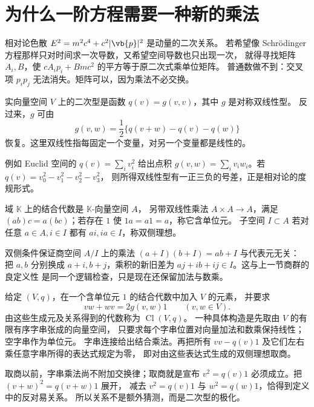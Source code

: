 \section{为什么一阶方程需要一种新的乘法}
\label{sec:math-clifford-first}

相对论色散 \(E^2=m^2c^4+c^2|\vb{p}|^2\) 是动量的二次关系。
若希望像 Schrödinger 方程那样只对时间求一次导数，又希望空间导数也只出现一次，
就得寻找矩阵 \(A_i,B\)，使 \(cA_i p_i+Bmc^2\) 的平方等于原二次式乘单位矩阵。
普通数做不到：交叉项 \(p_ip_j\) 无法消失。矩阵可以，因为乘法不必交换。

\begin{definition}[二次型与极化]
实向量空间 \(V\) 上的二次型是函数 \(q(v)=g(v,v)\)，其中 \(g\) 是对称双线性型。
反过来，\(g\) 可由
\[
g(v,w)=\frac12\{q(v+w)-q(v)-q(w)\}
\]
恢复。这里双线性指每固定一个变量，对另一个变量都是线性的。
\end{definition}

例如 Euclid 空间的 \(q(v)=\sum_i v_i^2\) 给出点积
\(g(v,w)=\sum_i v_iw_i\)。若 \(q(v)=v_0^2-v_1^2-v_2^2-v_3^2\)，
则所得双线性型有一正三负的号差，正是相对论的度规形式。

\begin{definition}[结合代数与双侧理想]
域 \(\mathbb K\) 上的结合代数是 \(\mathbb K\)-向量空间 \(A\)，
另带双线性乘法 \(A\times A\to A\)，满足
\((ab)c=a(bc)\)；若存在 \(1\) 使 \(1a=a1=a\)，称它含单位元。
子空间 \(I\subset A\) 若对任意 \(a\in A,i\in I\)
都有 \(ai,ia\in I\)，称双侧理想。
\end{definition}

双侧条件保证商空间 \(A/I\) 上的乘法
\((a+I)(b+I)=ab+I\) 与代表元无关：
把 \(a,b\) 分别换成 \(a+i,b+j\)，乘积的新旧差为
\(aj+ib+ij\in I\)。这与上一节商群的良定义性
是同一个逻辑检查，只是现在还保留加法与数乘。

\begin{definition}[Clifford 代数]
给定 \((V,q)\)，在一个含单位元 \(1\) 的结合代数中加入 \(V\) 的元素，
并要求
\[
vw+wv=2g(v,w)1\qquad(v,w\in V).
\]
由这些生成元及关系得到的代数称为 \(\operatorname{Cl}(V,q)\)。
一种具体构造是先取由 \(V\) 的有限有序字串张成的向量空间，
只要求每个字串位置对向量加法和数乘保持线性；空字串作为单位元。
字串连接给出结合乘法。再把所有
\(vv-q(v)1\) 及它们左右乘任意字串所得的表达式规定为零，
即对由这些表达式生成的双侧理想取商。
\end{definition}

取商以前，字串乘法尚不附加交换律；取商就是宣布
\(v^2=q(v)1\) 必须成立。把 \((v+w)^2=q(v+w)1\) 展开，
减去 \(v^2=q(v)1\) 与 \(w^2=q(w)1\)，恰得到定义中的反对易关系。
所以关系不是额外猜测，而是二次型的极化。

